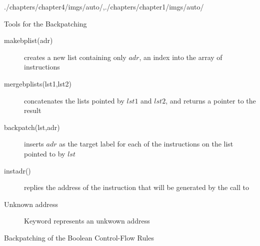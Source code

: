 \begin{graphicspathcontext}{{./chapters/chapter4/imgs/auto/},{./chapters/chapter1/imgs/auto/}}
\begin{bibunit}[apalike]
\begin{frame}[background=9]{Tools for the Backpatching}
	\begin{description}
	\item[makebplist(adr)] creates a new list containing only $adr$, an index into the array of instructions
	\vfill
	\item[mergebplists(lst1,lst2)] concatenates the lists pointed by $lst1$ and $lst2$, and returns a pointer to the result
	\vfill
	\item[backpatch(lst,adr)] inserts $adr$ as the target label for each of the instructions on the list pointed to by $lst$
	\vfill
	\item[instadr()] replies the address of the instruction that will be generated by the  call to 
	\vfill
	\item[Unknown address] Keyword  represents an unkwown address
	\end{description}
\end{frame}

\begin{frame}{Backpatching of the Boolean Control-Flow Rules}
	\begin{sdd}
	\hline
	\hline
	\hline
	\end{sdd}
\end{frame}


\end{bibunit}
\end{graphicspathcontext}
